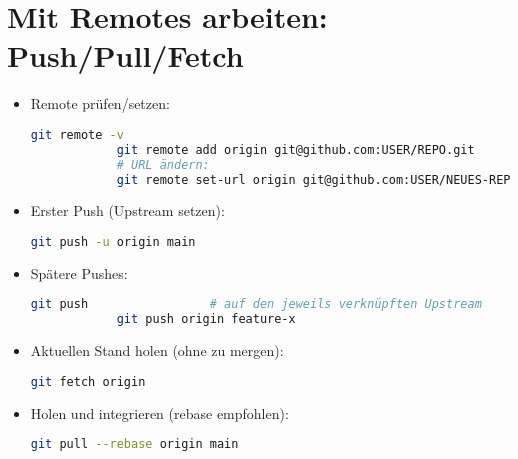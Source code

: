 \documentclass[a4paper,11pt]{article}
\begin{document}
	\section{Mit Remotes arbeiten: Push/Pull/Fetch}
	\begin{itemize}
		\item Remote prüfen/setzen:
		\begin{lstlisting}[language=bash]
			git remote -v
			git remote add origin git@github.com:USER/REPO.git
			# URL ändern:
			git remote set-url origin git@github.com:USER/NEUES-REPO.git
		\end{lstlisting}
		\item Erster Push (Upstream setzen):
		\begin{lstlisting}[language=bash]
			git push -u origin main
		\end{lstlisting}
		\item Spätere Pushes:
		\begin{lstlisting}[language=bash]
			git push                 # auf den jeweils verknüpften Upstream
			git push origin feature-x
		\end{lstlisting}
		\item Aktuellen Stand holen (ohne zu mergen):
		\begin{lstlisting}[language=bash]
			git fetch origin
		\end{lstlisting}
		\item Holen und integrieren (rebase empfohlen):
		\begin{lstlisting}[language=bash]
			git pull --rebase origin main
		\end{lstlisting}
	\end{itemize}
	
\end{document}
